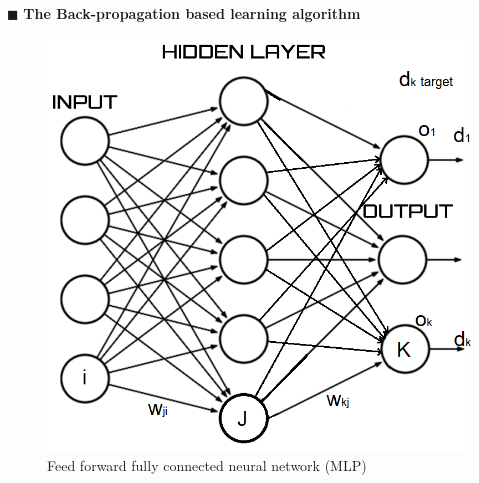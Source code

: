 \documentclass[../main.tex]{subfiles}
\begin{document}
\noindent$\blacksquare$ \textbf{The Back-propagation based learning algorithm}
\begin{figure}[H]
    \centering
    \includegraphics[scale = 0.3]{lectures/4_neural_networks/4_bpa.png}
    \caption{Feed forward fully connected neural network (MLP)}
    \label{fig:4_bpa}
\end{figure}
\end{document}
